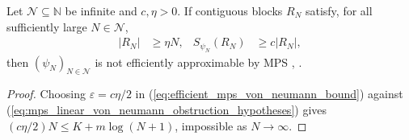 \begin{lemma}
    \label{thm:mps_linear_von_neumann_obstruction}
    \leanok
    Let $\mathcal N\subseteq\mathbb N$ be infinite and $c,\eta>0$. If contiguous
    blocks $R_N$ satisfy, for all sufficiently large $N\in\mathcal N$,
    \begin{align}
        \label{eq:mps_linear_von_neumann_obstruction_hypotheses}
        |R_N| & \ge\eta N,
              & S_{\psi_N}(R_N) & \ge c|R_N|,
    \end{align}
    then $(\psi_N)_{N\in\mathcal N}$ is not efficiently approximable by MPS
    \cite[lines 278--305]{Schuch2008EntropyScaling},
    \cite{gap:swvc08_von_neumann_error_range,gap:swvc08_interior_block_bond_rank}.
\end{lemma}
\begin{proof}\leanok
    Choosing $\varepsilon=c\eta/2$ in (\ref{eq:efficient_mps_von_neumann_bound})
    against (\ref{eq:mps_linear_von_neumann_obstruction_hypotheses}) gives
    $(c\eta/2)N\le K+m\log(N+1)$, impossible as $N\to\infty$.
\end{proof}
